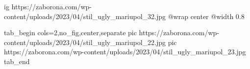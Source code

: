  
 
 
 
 

\ifcmt
  ig https://zaborona.com/wp-content/uploads/2023/04/stil_ugly_mariupol_32.jpg
  @wrap center
  @width 0.8
\fi


\ifcmt
  tab_begin cols=2,no_fig,center,separate
     pic https://zaborona.com/wp-content/uploads/2023/04/stil_ugly_mariupol_22.jpg
		 pic https://zaborona.com/wp-content/uploads/2023/04/stil_ugly_mariupol_23.jpg
  tab_end
\fi
